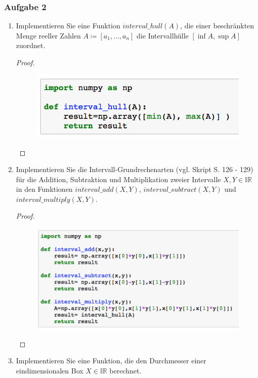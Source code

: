 \documentclass[12pt]{extreport} %
\theoremstyle{named}
\theoremstyle{nnamed}
\theoremstyle{itshape}
\theoremstyle{normal}
\begin{document}
\newpage

\subsubsection*{Aufgabe 2}

\begin{enumerate}
	\item Implementieren Sie eine Funktion $interval\_hull(A)$, die einer beschränkten Menge reeller Zahlen $A \coloneqq [a_1, . . . , a_n]$ die Intervallhülle $[\inf A, \sup A]$ zuordnet.
		\begin{proof} ~\
			\begin{figure}[h!] \centering
				\includegraphics[scale=0.75]{img/su2ii-i}
			\end{figure}
		\end{proof}
	\item Implementieren Sie die Intervall-Grundrechenarten (vgl. Skript S. 126 - 129) für die Addition, Subtraktion und Multiplikation zweier Intervalle $X, Y \in \mathbb{IR}$ in den Funktionen $interval\_add(X,Y)$, $interval\_subtract(X,Y)$ und   $interval\_multiply(X,Y)$.
		\begin{proof} ~\
			\begin{figure}[h!] \centering
				\includegraphics[scale=0.75]{img/su2ii-ii}
			\end{figure}
		\end{proof} \newpage
	\item Implementieren Sie eine Funktion, die den Durchmesser einer eindimensionalen Box $X \in \mathbb{IR}$ berechnet.

\end{enumerate}
\end{document}
